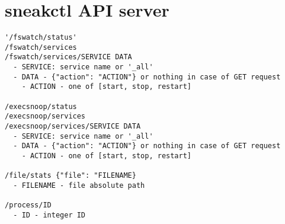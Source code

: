 \setcounter{figure}{0}
\setcounter{listing}{0}
\appendixpagenumbering

\chapter{sneakctl API server \label{appendix:sneakctl}}

\begin{lstlisting}[language=Clean, style=custom, label=appendix:sneakctl:api, caption={Outline of sneakctl API server endpoints.}]
'/fswatch/status'
/fswatch/services
/fswatch/services/SERVICE DATA
  - SERVICE: service name or '_all'
  - DATA - {"action": "ACTION"} or nothing in case of GET request
    - ACTION - one of [start, stop, restart]

/execsnoop/status
/execsnoop/services
/execsnoop/services/SERVICE DATA
  - SERVICE: service name or '_all'
  - DATA - {"action": "ACTION"} or nothing in case of GET request
    - ACTION - one of [start, stop, restart]
    
/file/stats {"file": "FILENAME}
  - FILENAME - file absolute path
  
/process/ID
  - ID - integer ID
\end{lstlisting}